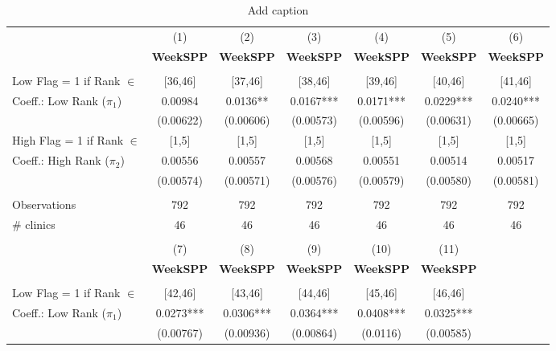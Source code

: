 \begin{table}[htbp]
  \centering
  \caption{Add caption}
    \begin{tabular}{lcccccr}
          & (1)   & (2)   & (3)   & (4)   & (5)   & \multicolumn{1}{c}{(6)} \\
          & \textbf{WeekSPP} & \textbf{WeekSPP} & \textbf{WeekSPP} & \textbf{WeekSPP} & \textbf{WeekSPP} & \multicolumn{1}{c}{\textbf{WeekSPP}} \\
          &       &       &       &       &       &  \\
    Low Flag = 1 if Rank $\in$ & [36,46] & [37,46] & [38,46] & [39,46] & [40,46] & \multicolumn{1}{c}{[41,46]} \\
    Coeff.: Low Rank ($\pi_1$) & 0.00984 & 0.0136** & 0.0167*** & 0.0171*** & 0.0229*** & \multicolumn{1}{c}{0.0240***} \\
          & (0.00622) & (0.00606) & (0.00573) & (0.00596) & (0.00631) & \multicolumn{1}{c}{(0.00665)} \\
    High Flag = 1 if Rank $\in$ & [1,5] & [1,5] & [1,5] & [1,5] & [1,5] & \multicolumn{1}{c}{[1,5]} \\
    Coeff.: High Rank ($\pi_2$) & 0.00556 & 0.00557 & 0.00568 & 0.00551 & 0.00514 & \multicolumn{1}{c}{0.00517} \\
          & (0.00574) & (0.00571) & (0.00576) & (0.00579) & (0.00580) & \multicolumn{1}{c}{(0.00581)} \\
          &       &       &       &       &       &  \\
    Observations & 792   & 792   & 792   & 792   & 792   & \multicolumn{1}{c}{792} \\
    \# clinics & 46    & 46    & 46    & 46    & 46    & \multicolumn{1}{c}{46} \\
          &       &       &       &       &       &  \\
          & (7)   & (8)   & (9)   & (10)  & (11)  &  \\
          & \textbf{WeekSPP} & \textbf{WeekSPP} & \textbf{WeekSPP} & \textbf{WeekSPP} & \textbf{WeekSPP} &  \\
          &       &       &       &       &       &  \\
    Low Flag = 1 if Rank $\in$ & [42,46] & [43,46] & [44,46] & [45,46] & [46,46] &  \\
    Coeff.: Low Rank ($\pi_1$) & 0.0273*** & 0.0306*** & 0.0364*** & 0.0408*** & 0.0325*** &  \\
          & (0.00767) & (0.00936) & (0.00864) & (0.0116) & (0.00585) &  \\

\end{tabular}
\end{table}
